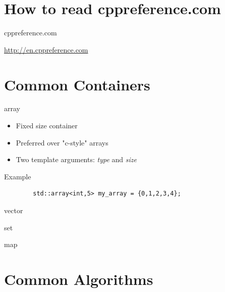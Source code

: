 \documentclass[notes]{beamer}
\begin{document}
\section{How to read cppreference.com}

\begin{frame}{cppreference.com}
	\begin{center}
		\url{http://en.cppreference.com}
	\end{center}
\end{frame}


\section{Common Containers}

\begin{frame}[fragile]{array}
	\begin{itemize}
		\item Fixed size container
		\item Preferred over "c-style" arrays
		\item Two template arguments: \textit{type} and \textit{size}
	\end{itemize}
	\bigskip
	\begin{exampleblock}{Example}
	\begin{verbatim}
		std::array<int,5> my_array = {0,1,2,3,4};
	\end{verbatim}
	\end{exampleblock}
\end{frame}

\begin{frame}{vector}

\end{frame}

\begin{frame}{set}

\end{frame}

\begin{frame}{map}

\end{frame}

\section{Common Algorithms}
\end{document}
